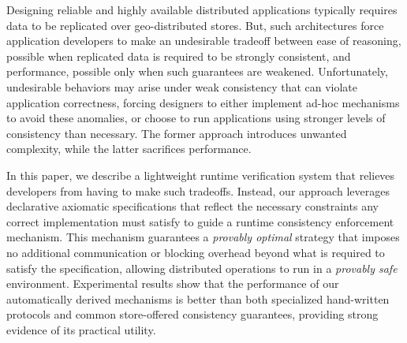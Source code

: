 
  Designing reliable and highly available distributed applications
  typically requires data to be replicated over geo-distributed
  stores.  But, such architectures force application developers to
  make an undesirable tradeoff between ease of reasoning, possible
  when replicated data is required to be strongly consistent, and
  performance, possible only when such guarantees are weakened.
  Unfortunately, undesirable behaviors may arise under weak
  consistency that can violate application correctness, forcing
  designers to either implement ad-hoc mechanisms to avoid these
  anomalies, or choose to run applications using stronger levels of
  consistency than necessary. The former approach introduces unwanted
  complexity, while the latter sacrifices performance.

  In this paper, we describe a lightweight runtime verification system
  that relieves developers from having to make such tradeoffs.
  Instead, our approach leverages declarative axiomatic specifications
  that reflect the necessary constraints any correct implementation
  must satisfy to guide a runtime consistency enforcement mechanism.
  This mechanism guarantees a \emph{provably optimal} strategy that
  imposes no additional communication or blocking overhead beyond what
  is required to satisfy the specification, allowing distributed
  operations to run in a \emph{provably safe} environment.
  Experimental results show that the performance of our automatically
  derived mechanisms is better than both specialized hand-written
  protocols and common store-offered consistency guarantees, providing
  strong evidence of its practical utility.
